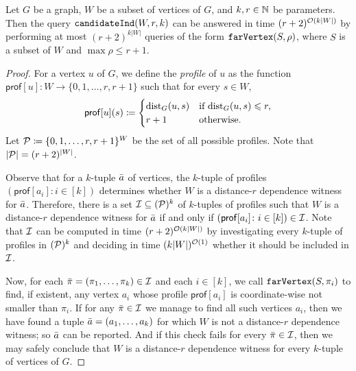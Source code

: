 \begin{lemma}\label{lem:candidateInd-far}
	Let $G$ be a graph, $W$ be a subset of vertices of $G$, and $k,r\in \N$ be parameters. Then the query $\candidateInd{W,r,k}$ can be answered in time $(r+2)^{\Oh(k|W|)}$ by performing at most $(r+2)^{k|W|}$ queries of the form $\far{S,\rho}$, where $S$ is a subset of $W$ and $\max \rho\leq r+1$.
\end{lemma}
\begin{proof}
	For a vertex $u$ of $G$, we define the \emph{profile} of $u$ as the function $\mathsf{prof}[u]\colon W\to \{0,1,\ldots,r,r+1\}$ such that for every $s\in W$,
	\[\mathsf{prof}[u](s)\coloneqq \begin{cases} \dist_G(u,s) &\textrm{if }\dist_G(u,s)\leq r,\\
		r+1 &\textrm{otherwise.}\end{cases}\]
	Let $\cal P\coloneqq \{0,1,\ldots,r,r+1\}^W$ be the set of all possible profiles. Note that $|\cal P|=(r+2)^{|W|}$. 
	
	Observe that for a $k$-tuple $\tup a$ of vertices, the $k$-tuple of profiles $(\mathsf{prof}[a_i]\colon i\in [k])$ determines whether $W$ is a distance-$r$ dependence witness for $\tup a$. Therefore, there is a set $\cal I\subseteq (\cal P)^k$ of $k$-tuples of profiles such that $W$ is a distance-$r$ dependence witness for $\tup a$ if and only if $(\mathsf{prof}[a_i]\colon i\in [k])\in \cal I$. Note that $\cal I$ can be computed in time $(r+2)^{\Oh(k|W|)}$ by investigating every $k$-tuple of profiles in $(\cal P)^k$ and deciding in time $(k|W|)^{\Oh(1)}$ whether it should be included in $\cal I$.
	
	Now, for each $\tup \pi=(\pi_1,\ldots,\pi_k)\in \cal I$ and each $i\in [k]$, we call $\far{S,\pi_i}$ to find, if existent, any vertex $a_i$ whose profile $\mathsf{prof}[a_i]$ is coordinate-wise not smaller than $\pi_i$. If for any $\tup \pi\in \cal I$ we manage to find all such vertices $a_i$, then we have found a tuple $\tup a=(a_1,\ldots,a_k)$ for which $W$ is not a distance-$r$ dependence witness; so $\tup a$ can be reported. And if this check fails for every $\tup \pi\in \cal I$, then we may safely conclude that $W$ is a distance-$r$ dependence witness for every $k$-tuple of vertices of $G$.
\end{proof}


